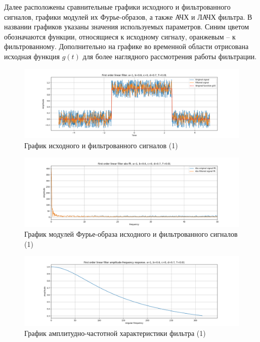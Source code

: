 \documentclass[a4paper, 12pt]{article}
\begin{document}
    Далее расположены сравнительные графики исходного и фильтрованного сигналов, графики модулей их Фурье-образов, а также АЧХ и ЛАЧХ фильтра.
    В названии графиков указаны значения используемых параметров. Синим цветом обозначаются функции, относящиеся к исходному сигналу, оранжевым
    -- к фильтрованному. Дополнительно на графике во временной области отрисована исходная функция $g(t)$ для более наглядного рассмотрения работы
    фильтрации.
    \begin{figure}[H]
        \centering
        \includegraphics[scale=0.4]{1_filtered_linear.png}
        \captionsetup{skip=0pt}
        \caption{График исходного и фильтрованного сигналов (1)}
        \label{fig:filin1}
    \end{figure}
    \begin{figure}[H]
        \centering
        \includegraphics[scale=0.4]{1_abs_filtered_linear.png}
        \captionsetup{skip=0pt}
        \caption{График модулей Фурье-образа исходного и фильтрованного сигналов (1)}
        \label{fig:filinabs1}
    \end{figure}
    \begin{figure}[H]
        \centering
        \includegraphics[scale=0.4]{1_afr_filtered_linear.png}
        \captionsetup{skip=0pt}
        \caption{График амплитудно-частотной характеристики фильтра (1)}
        \label{fig:filinafr1}
    \end{figure}
\end{document}
